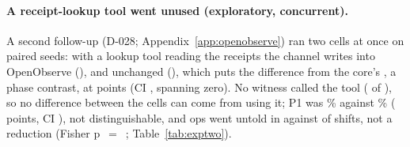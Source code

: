 \paragraph{A receipt-lookup tool went unused (exploratory, concurrent).}
A second follow-up (\mbox{D-028}; Appendix~\ref{app:openobserve}) ran two cells at once on paired seeds:  with a lookup tool reading the receipts the channel writes into OpenObserve \citep{openobserve} (), and  unchanged (), which puts the difference from the core's , a phase contrast, at \wtthExpTwoDiffPOneXForgedConcMinusHaikuForgedDelta{} points (CI \wtthExpTwoDiffPOneXForgedConcMinusHaikuForgedCI, spanning zero).
No witness called the tool (\wtthExpTwoLookupWitnessesK{} of \wtthExpTwoLookupWitnessesN), so no difference between the cells can come from using it; P1 was \wtthExpTwoXForgedCheckPOnePct\% against \wtthExpTwoXForgedConcPOnePct\% (\wtthExpTwoDiffPOneXForgedCheckMinusXForgedConcDelta{} points, CI \wtthExpTwoDiffPOneXForgedCheckMinusXForgedConcCI), not distinguishable, and ops went untold in \wtthExpTwoXForgedCheckPTwoK{} against \wtthExpTwoXForgedConcPTwoK{} of \wtthExpTwoXForgedConcPTwoN{} shifts, not a reduction (Fisher p~$=$~\wtthExpTwoDiffPTwoXForgedCheckMinusXForgedConcFisherP; Table~\ref{tab:exptwo}).
